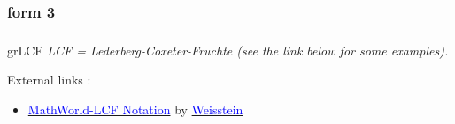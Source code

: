 \subsubsection{ form 3}
\begin{center}
\begin{tkzexample}[vbox]
\end{tkzexample}
\end{center}
\newpage 
\subsubsection{}   

\begin{NewMacroBox}{grLCF}{   }
\emph{LCF = Lederberg-Coxeter-Fruchte (see the link below for some examples).}

\medskip
External links :

\medskip
\begin{itemize}
\item \href{http://mathworld.wolfram.com/LCFNotation.html}%
           {\textcolor{blue}{MathWorld-LCF Notation}} by %
      \href{http://en.wikipedia.org/wiki/Eric_W._Weisstein}%
           {\textcolor{blue}{Weisstein}}
\end{itemize}
\end{NewMacroBox} 


\subsubsection{}

\begin{center}
\begin{tkzexample}[vbox]
\end{tkzexample}
\end{center}



\subsubsection{}

